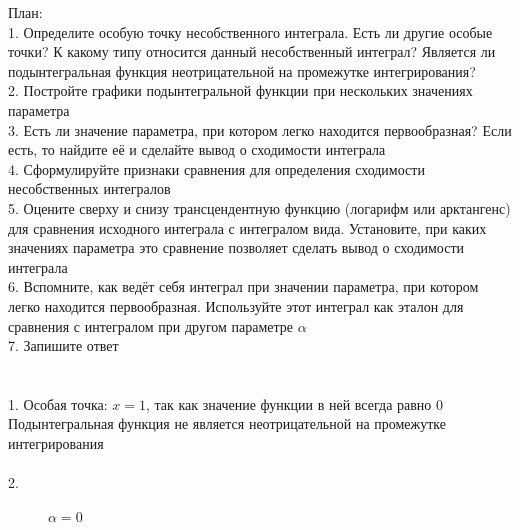 \documentclass{article}
\begin{document}
План:\\
1. Определите особую точку несобственного интеграла. Есть ли другие особые точки? К какому типу относится данный несобственный интеграл? Является ли подынтегральная функция неотрицательной на промежутке интегрирования?\\
2. Постройте графики подынтегральной функции при нескольких значениях параметра\\
3. Есть ли значение параметра, при котором легко находится первообразная? Если есть, то найдите её и сделайте вывод о сходимости интеграла\\
4. Сформулируйте признаки сравнения для определения сходимости несобственных интегралов\\
5. Оцените сверху и снизу трансцендентную функцию (логарифм или арктангенс) для сравнения исходного интеграла с интегралом вида. Установите, при каких значениях параметра это сравнение позволяет сделать вывод о сходимости интеграла\\
6. Вспомните, как ведёт себя интеграл при значении параметра, при котором легко находится первообразная. Используйте этот интеграл как эталон для сравнения с интегралом при другом параметре $ \alpha $ \\
7. Запишите ответ\\
\\\\
1. Особая точка: $ x = 1 $, так как значение функции в ней всегда равно $ 0 $\\
Подынтегральная функция не является неотрицательной на промежутке интегрирования\\\\
2. \\
\begin{figure}[h!]
\caption*{$ \alpha = 0 $}
\end{figure}\\
\end{document}
